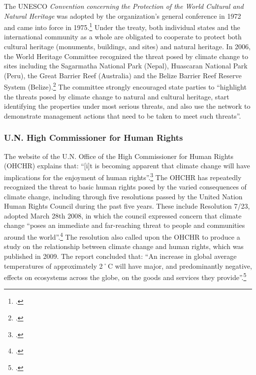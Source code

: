 \documentclass[10pt]{article}
\begin{document}
The UNESCO \emph{Convention concerning the Protection of the World Cultural and Natural Heritage} was adopted by the organization's general conference in 1972 and came into force in 1975.\footcite[][]{UNESCOTreaty}
Under the treaty, both individual states and the international community as a whole are obligated to cooperate to protect both cultural heritage (monuments, buildings, and sites) and natural heritage.
In 2006, the World Heritage Committee recognized the threat posed by climate change to sites including the Sagarmatha National Park (Nepal), Huascaran National Park (Peru), the Great Barrier Reef (Australia) and the Belize Barrier Reef Reserve System (Belize).\footcite[][]{UNESCO2006}
The committee strongly encouraged state parties to ``highlight the threats posed by climate change to natural and cultural heritage, start identifying the properties under most serious threats, and also use the network to demonstrate management actions that need to be taken to meet such threats''.



	\subsubsection{U.N. High Commissioner for Human Rights}



The website of the U.N. Office of the High Commissioner for Human Rights (OHCHR) explains that: ``[i]t is becoming apparent that climate change will have implications for the enjoyment of human rights''.\footcite[][]{UNHumanRightsWebsite}
The OHCHR has repeatedly recognized the threat to basic human rights posed by the varied consequences of climate change, including through five resolutions passed by the United Nation Human Rights Council during the past five years.
These include Resolution 7/23, adopted March 28th 2008, in which the council expressed concern that climate change ``poses an immediate and far-reaching threat to people and communities around the world''.\footcite[][]{UNHRC2008}
The resolution also called upon the OHCHR to produce a study on the relationship between climate change and human rights, which was published in 2009.
The report concluded that: ``An increase in global average temperatures of approximately 2˚C will have major, and predominantly negative, effects on ecosystems across the globe, on the goods and services they provide''.\footcite[][p. 7]{OHCHRStudy2009}
\end{document}
